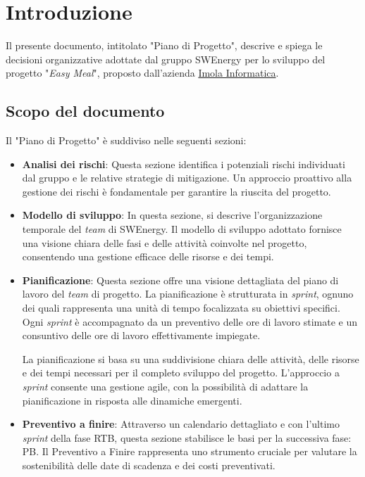 \section{Introduzione}

Il presente documento, intitolato "Piano di Progetto", descrive e spiega le
decisioni organizzative adottate dal gruppo SWEnergy per lo sviluppo del
progetto "\textit{Easy Meal}", proposto dall'azienda
\href{https://imolainformatica.it/}{Imola Informatica}.

\subsection{Scopo del documento}

Il "Piano di Progetto" è suddiviso nelle seguenti sezioni:

\begin{itemize}
	\item \textbf{Analisi dei rischi}: Questa sezione identifica i potenziali
	      rischi individuati dal gruppo e le relative strategie di mitigazione.
	      Un approccio proattivo alla gestione dei rischi è fondamentale
	      per garantire la riuscita del progetto.

	\item \textbf{Modello di sviluppo}: In questa sezione, si descrive
	      l'organizzazione temporale del \textit{team} di SWEnergy.
	      Il modello di sviluppo adottato fornisce una visione chiara delle fasi
	      e delle attività coinvolte nel progetto, consentendo una gestione
	      efficace delle risorse e dei tempi.

	\item \textbf{Pianificazione}: Questa sezione offre una visione dettagliata
	      del piano di lavoro del \textit{team} di progetto.
	      La pianificazione è strutturata in \textit{sprint}, ognuno dei quali
	      rappresenta una unità di tempo focalizzata su obiettivi specifici.
	      Ogni \textit{sprint} è accompagnato da un preventivo delle ore di lavoro stimate
	      e un consuntivo delle ore di lavoro effettivamente impiegate.

	      La pianificazione si basa su una suddivisione chiara delle attività, delle risorse
	      e dei tempi necessari per il completo sviluppo del progetto.
	      L'approccio a \textit{sprint} consente una gestione agile, con la possibilità di
	      adattare la pianificazione in risposta alle dinamiche emergenti.

	\item \textbf{Preventivo a finire}: Attraverso un calendario dettagliato e con l'ultimo
	      \textit{sprint} della fase RTB, questa sezione stabilisce le basi per la successiva fase: PB.
	      Il Preventivo a Finire rappresenta uno strumento cruciale per valutare
	      la sostenibilità delle date di scadenza e dei costi preventivati.


\end{itemize}
